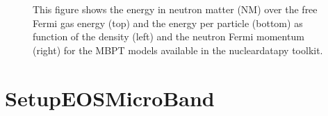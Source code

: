 \documentclass[letterpaper,10pt,english]{sphinxmanual}
\begin{document}
\begin{figure}[htbp]
\centering
\capstart

\noindent{}
\caption{This figure shows the energy in neutron matter (NM) over the free Fermi gas energy (top) and the energy per particle (bottom) as function of the density (left) and the neutron Fermi momentum (right) for the MBPT models available in the nucleardatapy toolkit.}\label{\detokenize{source/api/setup_matter_micro:id5}}\end{figure}

\sphinxstepscope


\section{SetupEOSMicroBand}
\label{\detokenize{source/api/setup_matter_micro_band:setupeosmicroband}}\label{\detokenize{source/api/setup_matter_micro_band::doc}}\label{\detokenize{source/api/setup_matter_micro_band:module-nucleardatapy.matter.setup_micro_band}}
\end{document}
